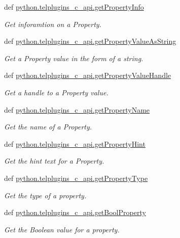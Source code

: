 \begin{DoxyCompactItemize}
def \hyperlink{group__plugin__properties_ga5df96ff59119ce817a25bb89eb1e8d27}{python.\-telplugins\-\_\-c\-\_\-api.\-get\-Property\-Info}
\begin{DoxyCompactList}\small\item\em Get inforamtion on a Property. \end{DoxyCompactList}\item 
def \hyperlink{group__plugin__properties_gaa8ff6a25f16d9f77184bbb1ababd5593}{python.\-telplugins\-\_\-c\-\_\-api.\-get\-Property\-Value\-As\-String}
\begin{DoxyCompactList}\small\item\em Get a Property value in the form of a string. \end{DoxyCompactList}\item 
def \hyperlink{group__plugin__properties_gada4bc485d848ccea8145629c72b48ec0}{python.\-telplugins\-\_\-c\-\_\-api.\-get\-Property\-Value\-Handle}
\begin{DoxyCompactList}\small\item\em Get a handle to a Property value. \end{DoxyCompactList}\item 
def \hyperlink{group__plugin__properties_gacd180d8f62da33b7c510a68aa2e444e4}{python.\-telplugins\-\_\-c\-\_\-api.\-get\-Property\-Name}
\begin{DoxyCompactList}\small\item\em Get the name of a Property. \end{DoxyCompactList}\item 
def \hyperlink{group__plugin__properties_ga28037c28c234490ad2fafc0bf87175bc}{python.\-telplugins\-\_\-c\-\_\-api.\-get\-Property\-Hint}
\begin{DoxyCompactList}\small\item\em Get the hint text for a Property. \end{DoxyCompactList}\item 
def \hyperlink{group__plugin__properties_gaff9d22463764227edbf4181f0b14e739}{python.\-telplugins\-\_\-c\-\_\-api.\-get\-Property\-Type}
\begin{DoxyCompactList}\small\item\em Get the type of a property. \end{DoxyCompactList}\item 
def \hyperlink{group__plugin__properties_ga075b02bf4853e3245fc0e256b50c09d6}{python.\-telplugins\-\_\-c\-\_\-api.\-get\-Bool\-Property}
\begin{DoxyCompactList}\small\item\em Get the Boolean value for a property. \end{DoxyCompactList}\item 

\end{DoxyCompactItemize}
